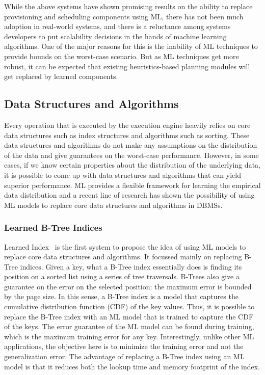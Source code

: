 \vspace{2mm}
While the above systems have shown promising results on the ability to replace provisioning and scheduling components using ML, there has not been much adoption in real-world systems, and there is a reluctance among systems developers to put scalability decisions in the hands of machine learning algorithms.
One of the major reasons for this is the inability of ML techniques to provide bounds on the worst-case scenario.
But as ML techniques get more robust, it can be expected that existing heuristics-based planning modules will get replaced by learned components.

\subsection{Data Structures and Algorithms}
Every operation that is executed by the execution engine heavily relies on core data structures such as index structures and algorithms such as sorting.
These data structures and algorithms do not make any assumptions on the distribution of the data and give guarantees on the worst-case performance.
However, in some cases, if we know certain properties about the distribution of the underlying data, it is possible to come up with data structures and algorithms that can yield superior performance.
ML provides a flexible framework for learning the empirical data distribution and a recent line of research has shown the possibility of using ML models to replace core data structures and algorithms in DBMSs.

\subsubsection{Learned B-Tree Indices}
Learned Index~\cite{learnedindex} is the first system to propose the idea of using ML models to replace core data structures and algorithms. It focussed mainly on replacing B-Tree indices. 
Given a key, what a B-Tree index essentially does is finding its position on a sorted list using a series of tree traversals.
B-Trees also give a guarantee on the error on the selected position: the maximum error is bounded by the page size.
In this sense, a B-Tree index is a model that captures the cumulative distribution function (CDF) of the key values.
Thus, it is possible to replace the B-Tree index with an ML model that is trained to capture the CDF of the keys.
The error guarantee of the ML model can be found during training, which is the maximum training error for any key.
Interestingly, unlike other ML applications, the objective here is to minimize the training error and not the generalization error.
The advantage of replacing a B-Tree index using an ML model is that it reduces both the lookup time and memory footprint of the index.

